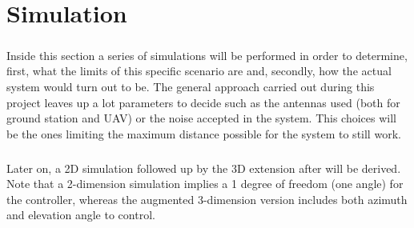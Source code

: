 \chapter{Simulation}\label{ch:sim}

\paragraph{} Inside this section a series of simulations will be performed in order to determine, first, what the limits of this specific scenario are and, secondly, how the actual system would turn out to be.
The general approach carried out during this project leaves up a lot parameters to decide such as the antennas used (both for ground station and UAV) or the noise accepted in the system. This choices will be the ones limiting the maximum distance possible for the system to still work.

\paragraph{} Later on, a 2D simulation followed up by the 3D extension after will be derived. Note that a 2-dimension simulation implies a 1 degree of freedom (one angle) for the controller, whereas the augmented 3-dimension version includes both azimuth and elevation angle to control.

